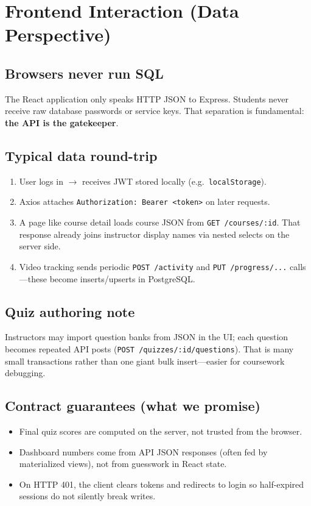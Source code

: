 
\chapter{Frontend Interaction (Data Perspective)}
\label{ch:frontend}

\section{Browsers never run SQL}
The React application only speaks HTTP JSON to Express. Students never receive raw database passwords or service keys. That separation is fundamental: \textbf{the API is the gatekeeper}.

\section{Typical data round-trip}
\begin{enumerate}[leftmargin=*]
  \item User logs in $\rightarrow$ receives JWT stored locally (e.g.\ \texttt{localStorage}).

  \item Axios attaches \texttt{Authorization: Bearer <token>} on later requests.

  \item A page like course detail loads course JSON from \texttt{GET /courses/:id}. That response already joins instructor display names via nested selects on the server side.

  \item Video tracking sends periodic \texttt{POST /activity} and \texttt{PUT /progress/...} calls---these become inserts/upserts in PostgreSQL.

\end{enumerate}

\section{Quiz authoring note}
Instructors may import question banks from JSON in the UI; each question becomes repeated API posts (\texttt{POST /quizzes/:id/questions}). That is many small transactions rather than one giant bulk insert---easier for coursework debugging.

\section{Contract guarantees (what we promise)}
\begin{itemize}[leftmargin=*]
  \item Final quiz scores are computed on the server, not trusted from the browser.

  \item Dashboard numbers come from API JSON responses (often fed by materialized views), not from guesswork in React state.

  \item On HTTP 401, the client clears tokens and redirects to login so half-expired sessions do not silently break writes.

\end{itemize}

